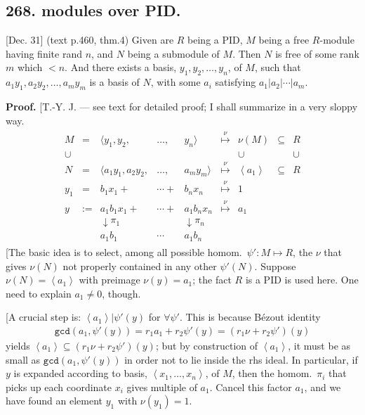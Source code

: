 \documentclass[12pt]{article}
\newcommand{\Ev}\forall%
\newcommand{\Ab}[1]{ \left\langle #1 \right\rangle } %
\newcommand{\Ss}[1]{\textsf{\bfseries{#1}}}%
\newcommand{\Tw}[1]{\texttt{#1}}%
\newcommand{\EqGo}[1]{ \begin{gather*}{#1}\end{gather*} } %
\begin{document}
\subsection*{268. modules over PID.} [Dec. 31] (text p.460, thm.4) Given are \(R\) being a PID, \(M\) being a free \(R\)-module having finite rand \(n\), and \(N\) being a submodule of \(M\). 
Then \(N\) is free of some rank \(m\) which \(<n\). 
And there exists a basis, \(y_1, y_2, \dotsc, y_n\), of \(M\), such that \(a_1 y_1, a_2 y_2, \dotsc, a_m y_m\) is a basis of \(N\), with some \(a_i\) satisfying \(a_1 \Big| a_2 \Big|\dotsb\Big| a_m\). \par
\Ss{Proof.} [T.-Y. J. --- see text for detailed proof; I shall summarize in a very sloppy way. 
\newcommand\Mnu{\overset{\nu}{\mapsto}}
\begin{gather*} \begin{matrix}
 M &= &\langle y_1, y_2, &\dotsc, &y_n \rangle &\Mnu &\nu(M) &\subseteq &R \\
 \cup & & & & & &\cup & &\cup \\
 N &= &\langle a_1 y_1, a_2 y_2, &\dotsc, &a_m y_m \rangle &\Mnu &\Ab{a_1} &\subseteq &R \\
 y_1 &= &b_1 x_1 +&\dotsb+ &b_n x_n &\Mnu &1 & \\
 y &:= &a_1 b_1 x_1 +&\dotsb+ &a_1 b_n x_n &\Mnu &a_1 & \\
 & &\downarrow \pi_1 & &\downarrow \pi_n & & & \\
 & &a_1 b_1 &\dotsb &a_1 b_n & & &
\end{matrix} \end{gather*} \indent [The basic idea is to select, among all possible homom.\ \(\psi': M \mapsto R\), the \(\nu\) that gives \(\nu(N)\) not properly contained in any other \(\psi'(N)\). 
Suppose \(\nu(N) =\Ab{a_1}\) with preimage \(\nu(y) =a_1\); the fact \(R\) is a PID is used here. 
One need to explain \(a_1 \neq 0\), though. \par
[A crucial step is: \(\Ab{a_1} \Big| \psi'(y)\) for \(\Ev \psi'\). 
This is because B\'ezout identity \EqGo{
 \Tw{gcd}(a_1,\psi'(y)) =r_1 a_1 +r_2 \psi'(y) =(r_1 \nu +r_2 \psi')(y)
} yields \(\Ab{a_1} \subseteq (r_1 \nu +r_2 \psi')(y)\); 
but by construction of \(\Ab{a_1}\), it must be as small as \(\Tw{gcd}(a_1,\psi'(y))\) in order not to lie inside the rhs ideal. 
In particular, if \(y\) is expanded according to basis, \(\Ab{x_1,\dotsc,x_n}\), of \(M\), then the homom.\ \(\pi_i\) that picks up each coordinate \(x_i\) gives multiple of \(a_1\). 
Cancel this factor \(a_1\), and we have found an element \(y_1\) with \(\nu(y_1) =1\).  \par
\end{document}
